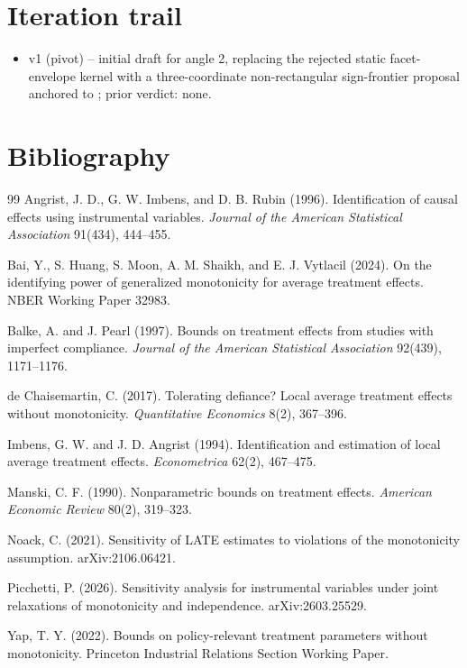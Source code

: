 \documentclass[11pt]{article}
\theoremstyle{definition}
\theoremstyle{plain}
\theoremstyle{remark}
\begin{document}
\section{Iteration trail}
\begin{itemize}[leftmargin=*]
\item v1 (pivot) -- initial draft for angle 2, replacing the rejected static
facet-envelope kernel with a three-coordinate non-rectangular sign-frontier
proposal anchored to \citet{Picchetti2026}; prior verdict: none.
\end{itemize}

\section*{Bibliography}
\begin{thebibliography}{99}
Angrist, J. D., G. W. Imbens, and D. B. Rubin (1996).
Identification of causal effects using instrumental variables.
\emph{Journal of the American Statistical Association} 91(434), 444--455.

Bai, Y., S. Huang, S. Moon, A. M. Shaikh, and E. J. Vytlacil (2024).
On the identifying power of generalized monotonicity for average treatment
effects.
NBER Working Paper 32983.

Balke, A. and J. Pearl (1997).
Bounds on treatment effects from studies with imperfect compliance.
\emph{Journal of the American Statistical Association} 92(439), 1171--1176.

de Chaisemartin, C. (2017).
Tolerating defiance? Local average treatment effects without monotonicity.
\emph{Quantitative Economics} 8(2), 367--396.

Imbens, G. W. and J. D. Angrist (1994).
Identification and estimation of local average treatment effects.
\emph{Econometrica} 62(2), 467--475.

Manski, C. F. (1990).
Nonparametric bounds on treatment effects.
\emph{American Economic Review} 80(2), 319--323.

Noack, C. (2021).
Sensitivity of LATE estimates to violations of the monotonicity assumption.
arXiv:2106.06421.

Picchetti, P. (2026).
Sensitivity analysis for instrumental variables under joint relaxations of
monotonicity and independence.
arXiv:2603.25529.

Yap, T. Y. (2022).
Bounds on policy-relevant treatment parameters without monotonicity.
Princeton Industrial Relations Section Working Paper.
\end{thebibliography}
\end{document}
